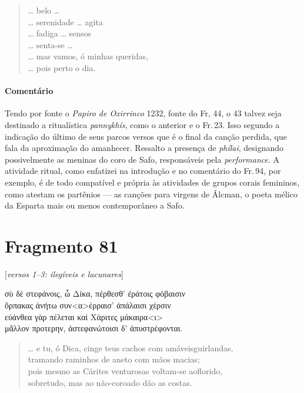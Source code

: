 \begin{verse}
\ldots{} belo \ldots{}\\
\ldots{} serenidade \ldots{} agita\\
\ldots{} fadiga \ldots{} sensos\\
\ldots{} senta-se \ldots{}\\
\ldots{} mas vamos, ó minhas queridas,\\
\ldots{} pois perto o dia.
\end{verse}

\medskip

{\paragraph{Comentário} Tendo por fonte o \emph{Papiro de Oxirrinco} 1232, fonte do Fr, 44, o 43 talvez seja destinado a ritualística \emph{pannykhís}, como o anterior e o Fr.\,23. Isso segundo a indicação do último de seus parcos versos que é o final da canção perdida, que fala da aproximação do amanhecer. Ressalto a presença de \emph{phílai}, designando possivelmente as meninas do coro de Safo, responsáveis pela \emph{performance}. A atividade ritual, como enfatizei na introdução e no comentário do Fr.\,94, por exemplo, é de todo compatível e própria às atividades de grupos corais femininos, como atestam os partênios --- as canções para virgens de Álcman, o poeta mélico da Esparta mais ou menos contemporâneo a Safo.}


\section{Fragmento 81}

\begin{gkverse}
\textnormal{[\emph{versos 1--3: ilegíveis e lacunares}]}

σὺ δὲ στεφάνοις, ὦ Δίκα, πέρθεσθ’ ἐράτοις φόβαισιν\\
ὄρπακας ἀνήτω συν<α>έρραισ’ ἀπάλαισι χέρσιν\\
εὐάνθεα \dagger{}γὰρ πέλεται\dagger{} καὶ Χάριτες μάκαιρα<ι>\\
μᾶλλον \dagger{}προτερην\dagger{}, ἀστεφανώτοισι δ’ ἀπυστρέφονται.
\end{gkverse}

\begin{verse}
\ldots{} e tu, ó Dica, cinge teus cachos com amáveis\qb{}guirlandas,\\
tramando raminhos de aneto com mãos macias;\\
pois mesmo as Cárites venturosas voltam-se ao\qb{}florido,\\
sobretudo, mas ao não-coroado dão as costas.
\end{verse}

